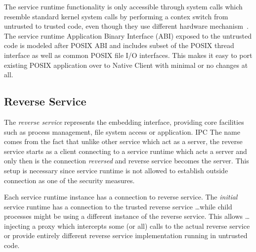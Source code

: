 The service runtime functionality is only accessible through system
calls which resemble standard kernel system calls by performing a contex
switch from untrusted to trusted code, even though they use different
hardware mechanism~\cite{yee:ieee-sp09,sehr:usenix-sec10}. The service
runtime Application Binary Interface (ABI) exposed to the untrusted code
is modeled after POSIX ABI and includes subset of the POSIX thread
interface as well as common POSIX file I/O interfaces. This makes it
easy to port existing POSIX application over to Native Client with
minimal or no changes at all.



\subsection{Reverse Service}


The \emph{reverse service} represents the embedding interface, providing
core facilities such as process management, file system access or
application. IPC %
The name comes from the fact that unlike other service which act as a
server, the reverse service starts as a client connecting to a service
runtime which acts a server and only then is the connection
\emph{reversed} and reverse service becomes the server. This setup is
necessary since service runtime is not allowed to establish outside
connection as one of the security measures.

Each service runtime instance has a connection to reverse service. The
\emph{initial} service runtime has a connection to the trusted reverse
service \ldots while child processes might be using a different instance
of the reverse service. This allows \ldots injecting a proxy which
intercepts some (or all) calls to the actual reverse service or provide
entirely different reverse service implementation running in untrusted
code.

